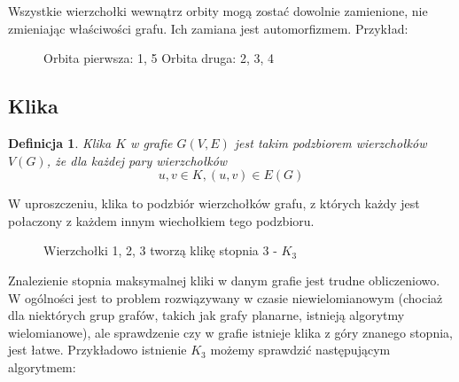 \documentclass[11pt]{article}
\newtheorem{definition}{Definicja}[section]
\begin{document}
Wszystkie wierzchołki wewnątrz orbity mogą zostać dowolnie zamienione, nie zmieniając właściwości grafu. Ich zamiana jest automorfizmem.
Przykład: 
\begin{figure}[H]
  \centering
    \caption{Orbita pierwsza: 1, 5 
    Orbita druga: 2, 3, 4}
 \end{figure}
 

   \subsection{Klika}
   \begin{definition}
    Klika $K$ w grafie $G(V,E)$ jest takim podzbiorem wierzchołków $V(G)$, że dla każdej pary wierzchołków $$u, v \in K, (u, v) \in E(G)$$ 
   \end{definition}
   
   W uproszczeniu, klika to podzbiór wierzchołków grafu, z których każdy jest połaczony z każdem innym wiechołkiem tego podzbioru.
   \begin{figure}[H]
   \centering
     \caption{Wierzchołki 1, 2, 3 tworzą klikę stopnia 3 - $K_3$ }
  \end{figure}

  Znalezienie stopnia maksymalnej kliki w danym grafie jest trudne obliczeniowo.
  W ogólności jest to problem rozwiązywany w czasie niewielomianowym (chociaż dla niektórych grup grafów, 
  takich jak grafy planarne, istnieją algorytmy wielomianowe), ale sprawdzenie czy w grafie istnieje klika
  z góry znanego stopnia, jest łatwe. Przykładowo istnienie $K_3$ możemy sprawdzić następującym algorytmem:
  
\end{document}
